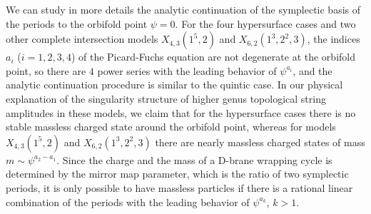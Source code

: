 \documentclass[12pt]{article}
\begin{document}
We can study in more details the analytic continuation of the
symplectic basis of the periods to the orbifold point $\psi=0$.
For the four hypersurface cases and two other complete
intersection models $X_{4,3}(1^5,2)$ and $X_{6,2}(1^3,2^2,3)$, the
indices $a_i$ ($i=1,2,3,4$) of the Picard-Fuchs equation are not
degenerate at the orbifold point, so there are $4$ power series
with the leading behavior of $\psi^{a_i}$, and the analytic
continuation procedure is similar to the quintic case. In our
physical explanation of the singularity structure of higher genus
topological string amplitudes in these models, we claim that for
the hypersurface cases there is no stable massless charged state around
the orbifold point, whereas for models $X_{4,3}(1^5,2)$ and
$X_{6,2}(1^3,2^2,3)$ there are nearly massless charged states of
mass $m\sim \psi^{a_2-a_1}$. Since the charge and the mass of a
D-brane wrapping cycle is determined by the mirror map parameter,
which is the ratio of two symplectic periods, it is only possible
to have massless particles if there is a rational linear
combination of the periods with the leading behavior of
$\psi^{a_k}$, $k>1$.
\end{document}
